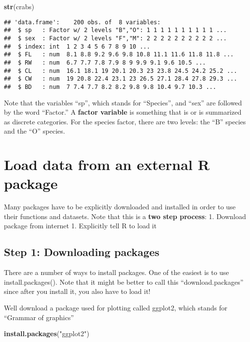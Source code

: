\documentclass[]{book}
\newenvironment{Shaded}{\begin{snugshade}}{\end{snugshade}}
\newcommand{\KeywordTok}[1]{\textcolor[rgb]{0.13,0.29,0.53}{\textbf{#1}}}
\newcommand{\StringTok}[1]{\textcolor[rgb]{0.31,0.60,0.02}{#1}}
\newcommand{\NormalTok}[1]{#1}
\theoremstyle{definition}
\theoremstyle{definition}
\theoremstyle{definition}
\theoremstyle{remark}
\begin{document}
\begin{Shaded}
\begin{Highlighting}[]
\KeywordTok{str}\NormalTok{(crabs)}
\end{Highlighting}
\end{Shaded}

\begin{verbatim}
## 'data.frame':    200 obs. of  8 variables:
##  $ sp   : Factor w/ 2 levels "B","O": 1 1 1 1 1 1 1 1 1 1 ...
##  $ sex  : Factor w/ 2 levels "F","M": 2 2 2 2 2 2 2 2 2 2 ...
##  $ index: int  1 2 3 4 5 6 7 8 9 10 ...
##  $ FL   : num  8.1 8.8 9.2 9.6 9.8 10.8 11.1 11.6 11.8 11.8 ...
##  $ RW   : num  6.7 7.7 7.8 7.9 8 9 9.9 9.1 9.6 10.5 ...
##  $ CL   : num  16.1 18.1 19 20.1 20.3 23 23.8 24.5 24.2 25.2 ...
##  $ CW   : num  19 20.8 22.4 23.1 23 26.5 27.1 28.4 27.8 29.3 ...
##  $ BD   : num  7 7.4 7.7 8.2 8.2 9.8 9.8 10.4 9.7 10.3 ...
\end{verbatim}

Note that the variables ``sp'', which stands for ``Species'', and
``sex'' are followed by the word ``Factor.'' A \textbf{factor variable}
is something that is or is summarized as discrete categories. For the
species factor, there are two levels: the ``B'' species and the ``O''
species.

\section{Load data from an external R
package}\label{load-data-from-an-external-r-package-1}

Many packages have to be explicitly downloaded and installed in order to
use their functions and datasets. Note that this is a \textbf{two step
process}: 1. Download package from internet 1. Explicitly tell R to load
it

\subsection{Step 1: Downloading
packages}\label{step-1-downloading-packages}

There are a number of ways to install packages. One of the easiest is to
use install.packages(). Note that it might be better to call this
``download.packages'' since after you install it, you also have to load
it!

Well download a package used for plotting called ggplot2, which stands
for ``Grammar of graphics''

\begin{Shaded}
\begin{Highlighting}[]
\KeywordTok{install.packages}\NormalTok{(}\StringTok{"ggplot2"}\NormalTok{)}
\end{Highlighting}
\end{Shaded}
\end{document}
